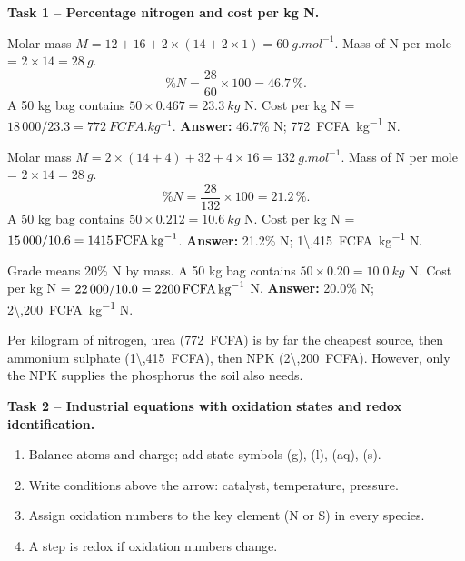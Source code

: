 \documentclass[11pt]{article}
\newcommand{\cle}[1]{{\popxbold\color{popdark}#1}}
\newcounter{popsec}
\newcounter{popsub}
\newcommand{\courssub}[1]{%
  \stepcounter{popsub}%
  \par\vspace{9pt}\noindent{\popxbold\fontsize{11.5}{13}\selectfont\color{popink}{\color{poporange}\thepopsec.\thepopsub}\hspace{6pt}#1}\par\nopagebreak\vspace{4pt}
}
\begin{document}
\courssub{Model answer}

\textbf{Task 1 -- Percentage nitrogen and cost per kg N.}

\begin{exoresolu}[Urea $\ce{CO(NH2)2}$]
Molar mass $M = 12 + 16 + 2\times(14 + 2\times1) = \SI{60}{g.mol^{-1}}$.
Mass of N per mole = $2 \times 14 = \SI{28}{g}$.
\[ \%N = \frac{28}{60}\times 100 = 46.7\,\%. \]
A 50 kg bag contains $50 \times 0.467 = \SI{23.3}{kg}$ N.
Cost per kg N = $18\,000 / 23.3 = \SI{772}{FCFA.kg^{-1}}$.
\tcblower
\textbf{Answer:} 46.7\% N; \SI{772}{FCFA.kg^{-1}} N.
\end{exoresolu}

\begin{exoresolu}
Molar mass $M = 2\times(14+4) + 32 + 4\times16 = \SI{132}{g.mol^{-1}}$.
Mass of N per mole = $2 \times 14 = \SI{28}{g}$.
\[ \%N = \frac{28}{132}\times 100 = 21.2\,\%. \]
A 50 kg bag contains $50 \times 0.212 = \SI{10.6}{kg}$ N.
Cost per kg N = $15\,000 / 10.6 = \SI{1\,415}{FCFA.kg^{-1}}$.
\tcblower
\textbf{Answer:} 21.2\% N; \SI{1\,415}{FCFA.kg^{-1}} N.
\end{exoresolu}

\begin{exoresolu}[NPK 20-10-10]
Grade means 20\% N by mass. A 50 kg bag contains $50 \times 0.20 = \SI{10.0}{kg}$ N.
Cost per kg N = $22\,000 / 10.0 = \SI{2\,200}{FCFA.kg^{-1}}$ N.
\tcblower
\textbf{Answer:} 20.0\% N; \SI{2\,200}{FCFA.kg^{-1}} N.
\end{exoresolu}

\begin{aretenir}
Per kilogram of nitrogen, urea (\SI{772}{FCFA}) is by far the cheapest source, then ammonium sulphate (\SI{1\,415}{FCFA}), then NPK (\SI{2\,200}{FCFA}). However, only the NPK supplies the phosphorus the soil also needs.
\end{aretenir}

\textbf{Task 2 -- Industrial equations with oxidation states and redox identification.}

\begin{methode}
\begin{enumerate}
\item Balance atoms and charge; add state symbols (g), (l), (aq), (s).
\item Write conditions above the arrow: catalyst, temperature, pressure.
\item Assign oxidation numbers to the key element (N or S) in every species.
\item A step is \cle{redox} if oxidation numbers change.
\end{enumerate}
\end{methode}
\end{document}
